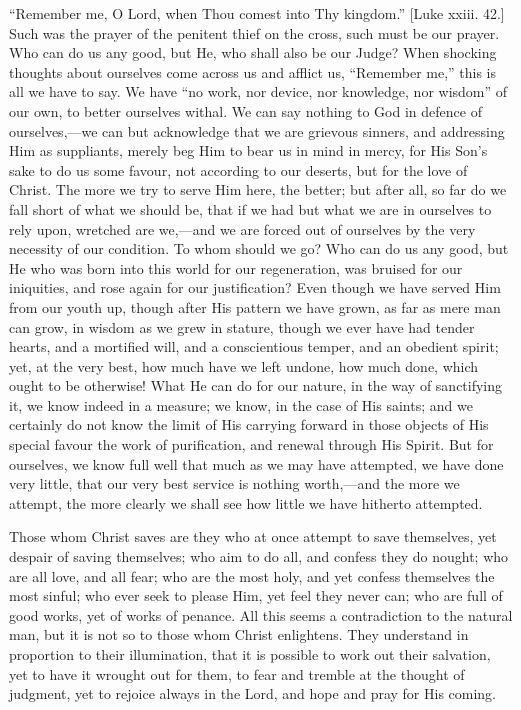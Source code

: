 ``Remember me, O Lord, when Thou comest into Thy kingdom.''
[Luke xxiii. 42.] Such was the prayer of the penitent thief on the
cross, such must be our prayer. Who can do us any good, but He, who
shall also be our Judge? When shocking thoughts about ourselves come
across us and afflict us, ``Remember me,'' this is all we have
to say. We have ``no work, nor device, nor knowledge, nor
wisdom'' of our own, to better ourselves withal. We can say
nothing to God in defence of ourselves,—we can but acknowledge that
we are grievous sinners, and addressing Him as suppliants, merely beg
Him to bear us in mind in mercy, for His Son's sake to do us some
favour, not according to our deserts, but for the love of Christ. The
more we try to serve Him here, the better; but after all, so far do we
fall short of what we should be, that if we had but what we are in
ourselves to rely upon, wretched are we,—and we are forced out of
ourselves by the very necessity of our condition. To whom should we
go? Who can do us any good, but He who was born into this world for
our regeneration, was bruised for our iniquities, and rose again for
our justification? Even though we have served Him from our youth up,
though after His pattern we have grown, as far as mere man can grow,
in wisdom as we grew in stature, though we ever have had tender
hearts, and a mortified will, and a conscientious temper, and an
obedient spirit; yet, at the very best, how much have we left undone,
how much done, which ought to be otherwise! What He can do for our
nature, in the way of sanctifying it, we know indeed in a measure; we
know, in the case of His saints; and we certainly do not know the
limit of His carrying forward in those objects of His special favour
the work of purification, and renewal through His Spirit. But for
ourselves, we know full well that much as we may have attempted, we
have done very little, that our very best service is nothing worth,—and
the more we attempt, the more clearly we shall see how little we have
hitherto attempted.

Those whom Christ saves are they who at once attempt to save
themselves, yet despair of saving themselves; who aim to do all, and
confess they do nought; who are all love, and all fear; who are the
most holy, and yet confess themselves the most sinful; who ever seek
to please Him, yet feel they never can; who are full of good works,
yet of works of penance. All this seems a contradiction to the natural
man, but it is not so to those whom Christ enlightens. They understand
in proportion to their illumination, that it is possible to work out
their salvation, yet to have it wrought out for them, to fear and
tremble at the thought of judgment, yet to rejoice always in the Lord,
and hope and pray for His coming.

